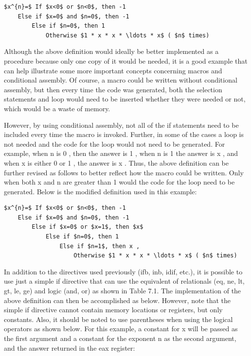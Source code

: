 \documentclass[10pt]{book}
\begin{document}
\begin{verbatim}
$x^{n}=$ If $x<0$ or $n<0$, then -1
    Else if $x=0$ and $n=0$, then -1
        Else if $n=0$, then 1
            Otherwise $1 * x * x * \ldots * x$ ( $n$ times)
\end{verbatim}

Although the above definition would ideally be better implemented as a procedure because only one copy of it would be needed, it is a good example that can help illustrate some more important concepts concerning macros and conditional assembly. Of course, a macro could be written without conditional assembly, but then every time the code was generated, both the selection statements and loop would need to be inserted whether they were needed or not, which would be a waste of memory.

However, by using conditional assembly, not all of the if statements need to be included every time the macro is invoked. Further, in some of the cases a loop is not needed and the code for the loop would not need to be generated. For example, when n is 0 , then the answer is 1 , when n is 1 the answer is x , and when x is either 0 or 1 , the answer is x . Thus, the above definition can be further revised as follows to better reflect how the macro could be written. Only when both x and n are greater than 1 would the code for the loop need to be generated. Below is the modified definition used in this example:

\begin{verbatim}
$x^{n}=$ If $x<0$ or $n<0$, then -1
    Else if $x=0$ and $n=0$, then -1
        Else if $x=0$ or $x=1$, then $x$
            Else if $n=0$, then 1
                Else if $n=1$, then x ,
                    Otherwise $1 * x * x * \ldots * x$ ( $n$ times)
\end{verbatim}

In addition to the directives used previously (ifb, inb, idif, etc.), it is possible to use just a simple if directive that can use the equivalent of relationals (eq, ne, lt, gt, le, ge) and logic (and, or) as shown in Table 7.1. The implementation of the above definition can then be accomplished as below. However, note that the simple if directive cannot contain memory locations or registers, but only constants. Also, it should be noted to use parentheses when using the logical operators as shown below. For this example, a constant for x will be passed as the first argument and a constant for the exponent n as the second argument, and the answer returned in the eax register:
\end{document}
